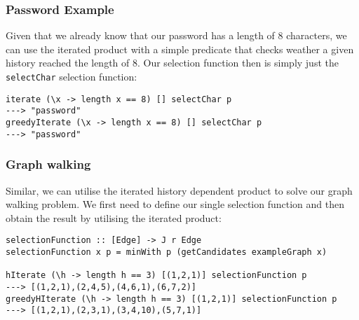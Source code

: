 \documentclass[runningheads]{llncs}
\begin{document}
\subsubsection{Password Example}
Given that we already know that our password has a length of 8 characters, we can use the iterated product with a simple predicate that checks weather a given history reached the length of 8. Our selection function then is simply just the \texttt{selectChar} selection function:
\begin{verbatim}
iterate (\x -> length x == 8) [] selectChar p
---> "password"
greedyIterate (\x -> length x == 8) [] selectChar p
---> "password"
\end{verbatim}
\subsubsection{Graph walking}
Similar, we can utilise the iterated history dependent product to solve our graph walking problem. We first need to define our single selection function and then obtain the result by utilising the iterated product:
\begin{verbatim}
selectionFunction :: [Edge] -> J r Edge
selectionFunction x p = minWith p (getCandidates exampleGraph x)

hIterate (\h -> length h == 3) [(1,2,1)] selectionFunction p
---> [(1,2,1),(2,4,5),(4,6,1),(6,7,2)]
greedyHIterate (\h -> length h == 3) [(1,2,1)] selectionFunction p
---> [(1,2,1),(2,3,1),(3,4,10),(5,7,1)]
\end{verbatim}
\end{document}
